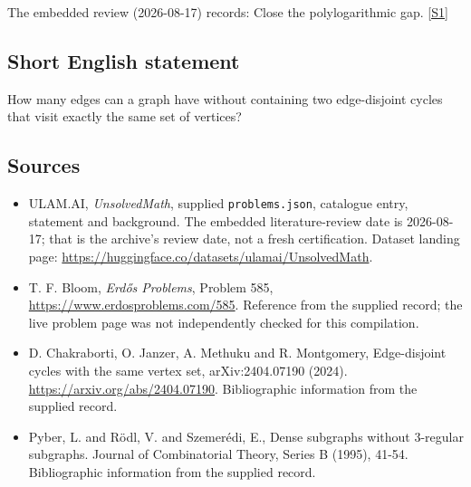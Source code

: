 \documentclass[11pt,a4paper]{article}
\newcommand{\sref}[2]{\hyperlink{source:#1:#2}{[S#2]}}
\begin{document}
The embedded review (2026-08-17) records: Close the polylogarithmic gap. \sref{statement}{1}

\subsection{Short English statement}

How many edges can a graph have without containing two edge-disjoint cycles that visit exactly the same set of vertices?

\subsection{Sources}

{\small

\begin{itemize}

\item[\hypertarget{source:statement:1}{S1}] ULAM.AI, \emph{UnsolvedMath}, supplied \texttt{problems.json}, catalogue entry, statement and background. The embedded literature-review date is 2026-08-17; that is the archive’s review date, not a fresh certification. Dataset landing page: \url{https://huggingface.co/datasets/ulamai/UnsolvedMath}.

\item[\hypertarget{source:statement:2}{S2}] T. F. Bloom, \emph{Erdős Problems}, Problem 585, \url{https://www.erdosproblems.com/585}. Reference from the supplied record; the live problem page was not independently checked for this compilation.

\item[\hypertarget{source:statement:3}{S3}] D. Chakraborti, O. Janzer, A. Methuku and R. Montgomery, Edge-disjoint cycles with the same vertex set, arXiv:2404.07190 (2024). \url{https://arxiv.org/abs/2404.07190}. Bibliographic information from the supplied record.

\item[\hypertarget{source:statement:4}{S4}] Pyber, L. and R\"{o}dl, V. and Szemer\'{e}di, E., Dense subgraphs without 3-regular subgraphs. Journal of Combinatorial Theory, Series B (1995), 41-54. Bibliographic information from the supplied record.

\end{itemize}

}

\label{end:statement}
\end{document}
